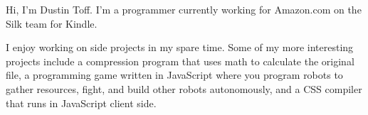 Hi, I'm Dustin Toff. I'm a programmer currently working for Amazon.com on the Silk team for Kindle.

I enjoy working on side projects in my spare time. Some of my more interesting projects include a compression program that uses math to calculate the original file, a programming game written in JavaScript where you program robots to gather resources, fight, and build other robots autonomously, and a CSS compiler that runs in JavaScript client side.
